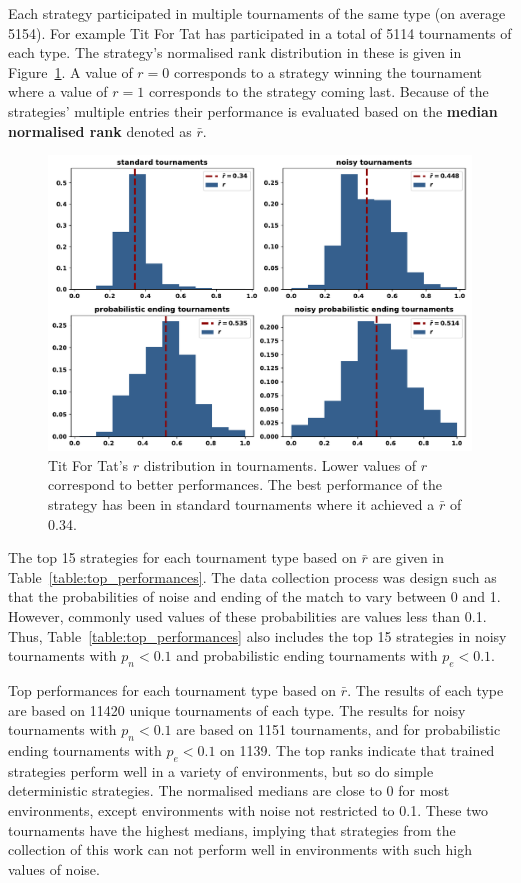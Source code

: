\documentclass{article}
\begin{document}
Each strategy participated in multiple tournaments of the same type (on average 5154).
For example Tit For Tat has participated in a total of 5114
tournaments of each type. The strategy's normalised rank distribution in these
is given in Figure~\ref{fig:tit_for_tat_r_distribution}. A value of \(r =
0\) corresponds to a strategy winning the tournament where a value of
\(r = 1\) corresponds to the strategy coming last. Because of the strategies'
multiple entries their performance is evaluated based on the
\textbf{median normalised rank} denoted as \(\bar{r}\).

\begin{figure}[!htbp]
    \centering
    \includegraphics[width=.60\textwidth]{../images/tit_for_tat_r_distributions.pdf}
    \caption{Tit For Tat's $r$ distribution in tournaments. Lower values of \(r\)
    correspond to better performances. The best performance
    of the strategy has been in standard tournaments where it achieved a $\bar{r}$
    of 0.34.}
    \label{fig:tit_for_tat_r_distribution}
\end{figure}

The top 15 strategies for each tournament type based on \(\bar{r}\) are given in
Table~\ref{table:top_performances}. The data collection process was design such
as that the probabilities of noise and ending of the match to vary between 0 and
1. However, commonly used values of these probabilities are
values less than 0.1. Thus,
Table~\ref{table:top_performances} also includes the top 15 strategies in noisy
tournaments with \(p_n < 0.1\) and probabilistic ending tournaments with \(p_e <
0.1\).

\begin{table}[!htbp]
    \begin{center}
    \resizebox{\textwidth}{!}{
        
    }
\end{center}
\caption{Top performances for each tournament type based on $\bar{r}$. The results
of each type are based on 11420 unique tournaments of each type. The results
for noisy tournaments with \(p_n < 0.1\) are based on 1151 tournaments, and 
for probabilistic ending tournaments with \(p_e < 0.1\) on 1139. The top ranks
indicate that trained strategies perform well in a variety of environments,
but so do simple deterministic strategies. The normalised medians are close to 0
for most environments, except environments with noise not restricted to 0.1.
These two tournaments have the highest medians, implying that strategies from
the collection of this work can not perform well in environments with such high
values of noise.}
\label{table:top_performances}
\end{table}
\end{document}
